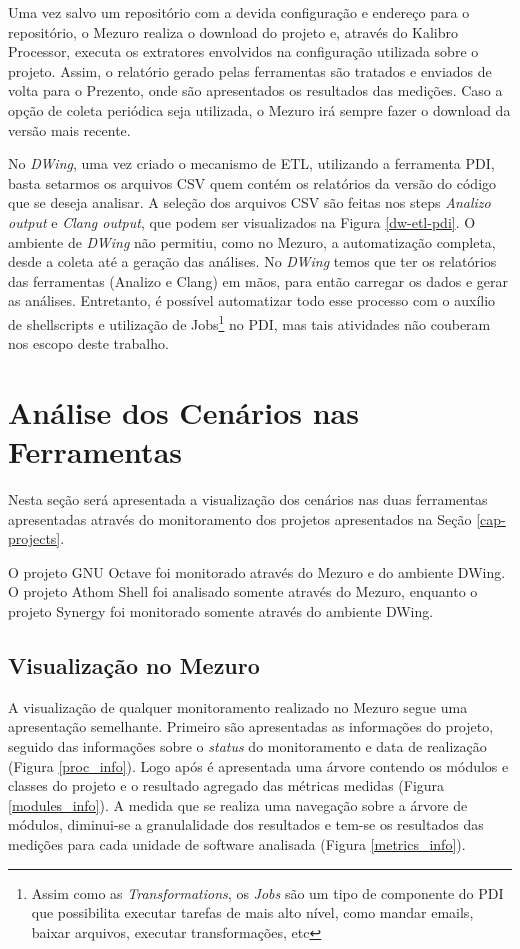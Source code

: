 Uma vez salvo um repositório com a devida configuração e endereço para o repositório, o Mezuro realiza o download do projeto e, através do Kalibro Processor, executa os extratores envolvidos na configuração utilizada sobre o projeto. Assim, o relatório gerado pelas ferramentas são tratados e enviados de volta para o Prezento, onde são apresentados os resultados das medições. Caso a opção de coleta periódica seja utilizada, o Mezuro irá sempre fazer o download da versão mais recente.


No \emph{DWing}, uma vez criado o mecanismo de ETL, utilizando a ferramenta PDI, basta setarmos os arquivos  CSV  quem contém os relatórios da versão do código que se deseja analisar. A seleção dos arquivos CSV são feitas nos steps \emph{Analizo output} e \emph{Clang output}, que podem ser visualizados na Figura \ref{dw-etl-pdi}. O ambiente de \emph{DWing} não permitiu, como no Mezuro, a automatização completa, desde a coleta até a geração das análises. No \emph{DWing} temos que ter os relatórios das ferramentas (Analizo e Clang) em mãos, para então carregar os dados e gerar as análises. Entretanto, é possível automatizar todo esse processo com o auxílio de shellscripts e utilização de Jobs\footnote{Assim como as \emph{Transformations}, os \emph{Jobs} são um tipo de componente do PDI que possibilita executar tarefas de mais alto nível, como mandar emails, baixar arquivos, executar transformações, etc} no PDI, mas tais atividades não couberam nos escopo deste trabalho.


\section{Análise dos Cenários nas Ferramentas}

Nesta seção será apresentada a visualização dos cenários nas duas ferramentas apresentadas através do monitoramento dos projetos apresentados na Seção \ref{cap-projects}.

O projeto GNU Octave foi monitorado através do Mezuro e do ambiente DWing. O projeto Athom Shell foi analisado somente através do Mezuro, enquanto o projeto Synergy foi monitorado somente através do ambiente DWing.

\subsection{Visualização no Mezuro}
\label{vision-mezuro}

A visualização de qualquer monitoramento realizado no Mezuro segue uma apresentação semelhante. Primeiro são apresentadas as informações do projeto, seguido das informações sobre o \emph{status} do monitoramento e data de realização (Figura \ref{proc_info}). Logo após é apresentada uma árvore contendo os módulos e classes do projeto e o resultado agregado das métricas medidas  (Figura \ref{modules_info}). A medida que se realiza uma navegação sobre a árvore de módulos, diminui-se a granulalidade dos resultados e tem-se os resultados das medições para cada unidade de software analisada (Figura \ref{metrics_info}).

